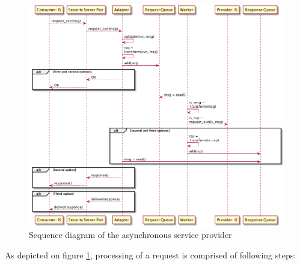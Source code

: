 \documentclass[10pt,a4paper]{article}
\begin{document}
\begin{figure}[htp]
	\begin{center}
		\includegraphics[width=.85\textwidth]{gfx/5_seq.png}
		\caption{Sequence diagram of the asynchronous service provider}
		\label{fig:p:5:async}
	\end{center}
\end{figure}

As depicted on figure \ref{fig:p:5:async}, processing of a request is comprised of following steps:
\end{document}
